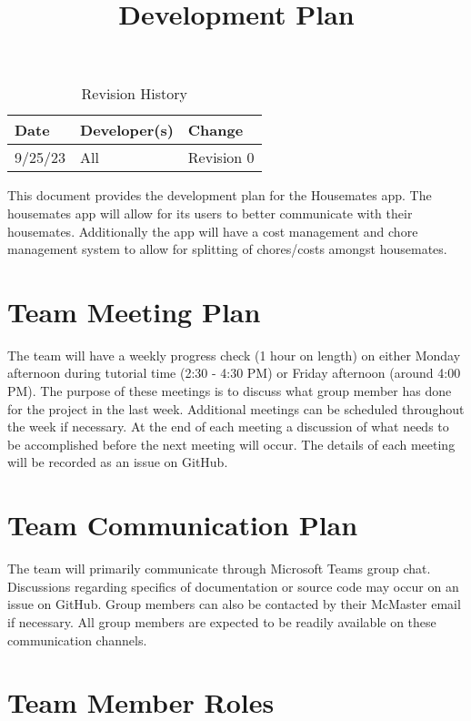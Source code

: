 \documentclass{article}
\title{Development Plan\\\progname}
\author{\authname}
\date{}
\begin{document}
\maketitle

\begin{table}[hp]
\caption{Revision History} \label{TblRevisionHistory}
\begin{tabularx}{\textwidth}{llX}
\toprule
\textbf{Date} & \textbf{Developer(s)} & \textbf{Change}\\
\midrule
9/25/23 & All & Revision 0\\
\bottomrule
\end{tabularx}
\end{table}


This document provides the development plan for the Housemates app. The housemates app will allow for its users to better communicate with their housemates.  Additionally the app will have a cost management and chore management system to allow for splitting of chores/costs amongst housemates.

\section{Team Meeting Plan}

The team will have a weekly progress check (1 hour on length) on either Monday afternoon during tutorial time (2:30 - 4:30 PM) or Friday afternoon (around 4:00 PM). The purpose of these meetings is to discuss what group member has done for the project in the last week. Additional meetings can be scheduled throughout the week if necessary. At the end of each meeting a discussion of what needs to be accomplished before the next meeting will occur. The details of each meeting will be recorded as an issue on GitHub.


\section{Team Communication Plan}

The team will primarily communicate through Microsoft Teams group chat. Discussions regarding specifics of documentation or source code may occur on an issue on GitHub. Group members can also be contacted by their McMaster email if necessary. All group members are expected to be readily available on these communication channels.

\section{Team Member Roles}
\end{document}
